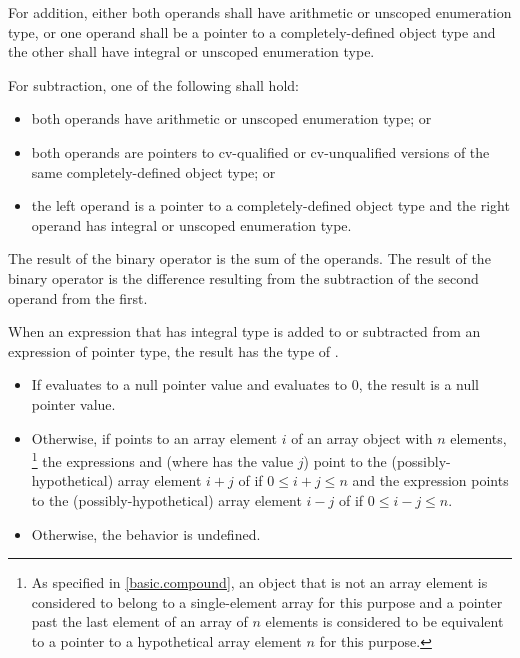 %
For addition, either both operands shall have arithmetic or unscoped enumeration
type, or one operand shall be a pointer to a completely-defined object
type and the other shall have integral or unscoped enumeration type.

\pnum
For subtraction, one of the following shall hold:
\begin{itemize}
\item both operands have arithmetic or unscoped enumeration type; or

%
\item both operands are pointers to cv-qualified or cv-unqualified
versions of the same completely-defined object type; or

\item the left operand is a pointer to a completely-defined object type
and the right operand has integral or unscoped enumeration type.
\end{itemize}

\pnum
The result of the binary \tcode{+} operator is the sum of the operands.
The result of the binary \tcode{-} operator is the difference resulting
from the subtraction of the second operand from the first.

\pnum
{}%
When an expression  that has integral type
is added to or subtracted from an expression  of pointer type,
the result has the type of .
\begin{itemize}
\item If  evaluates to a null pointer value and
 evaluates to 0, the result is a null pointer value.
\item Otherwise, if  points to an array element $i$
of an array object  with $n$ elements,%
\footnote{As specified in \ref{basic.compound},
an object that is not an array element
is considered to belong to a single-element array for this purpose and
a pointer past the last element of an array of $n$ elements
is considered to be equivalent to a pointer to a hypothetical array element
$n$ for this purpose.}
the expressions  and 
(where  has the value $j$)
point to the (possibly-hypothetical) array element
$i + j$ of  if $0 \le i + j \le n$
and the expression 
points to the (possibly-hypothetical) array element
$i - j$ of  if $0 \le i - j \le n$.
\item Otherwise, the behavior is undefined.
\end{itemize}

